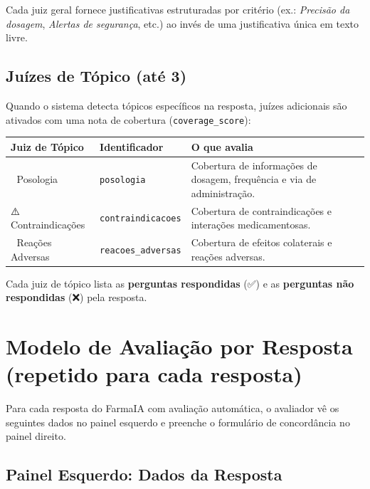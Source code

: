 \documentclass[12pt,a4paper]{article}
\begin{document}
Cada juiz geral fornece justificativas estruturadas por critério
(ex.: \textit{Precisão da dosagem}, \textit{Alertas de segurança},
etc.) ao invés de uma justificativa única em texto livre.

\subsection*{Juízes de Tópico (até 3)}

Quando o sistema detecta tópicos específicos na resposta, juízes
adicionais são ativados com uma nota de cobertura
(\texttt{coverage\_score}):

\begin{center}
\small
\begin{tabularx}{\textwidth}{@{}l l X@{}}
\toprule
\textbf{Juiz de Tópico} & \textbf{Identificador} & \textbf{O que avalia} \\
\midrule
💊 Posologia & \texttt{posologia} &
  Cobertura de informações de dosagem, frequência e via de
  administração. \\[6pt]
⚠️ Contraindicações & \texttt{contraindicacoes} &
  Cobertura de contraindicações e interações
  medicamentosas. \\[6pt]
🔬 Reações Adversas & \texttt{reacoes\_adversas} &
  Cobertura de efeitos colaterais e reações adversas. \\
\bottomrule
\end{tabularx}
\end{center}

Cada juiz de tópico lista as \textbf{perguntas respondidas}
(✅) e as \textbf{perguntas não respondidas} (❌) pela resposta.

\newpage

\section*{Modelo de Avaliação por Resposta \hfill (repetido para cada resposta)}

Para cada resposta do FarmaIA com avaliação automática, o avaliador
vê os seguintes dados no painel esquerdo e preenche o formulário
de concordância no painel direito.

\vspace{3mm}
\subsection*{Painel Esquerdo: Dados da Resposta}
\end{document}
